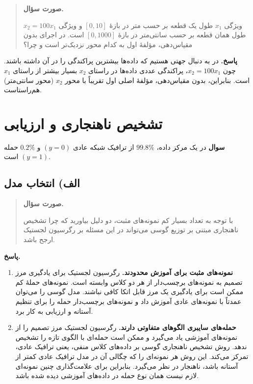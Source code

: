 \documentclass{article}
\numberwithin{equation}{section}
\numberwithin{table}{section}
\newenvironment{questionprompt}{%
    \begin{quote}\noindent\textbf{صورت سؤال.}\enspace\ignorespaces
}{%
    \end{quote}\noindent\textbf{پاسخ.}\enspace\ignorespacesafterend
}
\begin{document}
\begin{questionprompt}
    ویژگی \(x_1\) طول یک قطعه بر حسب متر در بازهٔ \([0,10]\) و ویژگی \(x_2=100x_1\) طول همان قطعه بر حسب سانتی‌متر در بازهٔ \([0,1000]\) است. در اجرای  بدون مقیاس‌دهی، مؤلفهٔ اول به کدام محور نزدیک‌تر است و چرا؟
\end{questionprompt}
در  به دنبال جهتی هستیم که داده‌ها بیشترین پراکندگی را در آن داشته باشند. چون \(x_2=100x_1\)، پراکندگی عددی داده‌ها در راستای \(x_2\) بسیار بیشتر از راستای \(x_1\) است. بنابراین، بدون مقیاس‌دهی، مؤلفهٔ اصلی اول تقریباً با محور \(x_2\) (محور سانتی‌متر) هم‌راستاست.

\section{تشخیص ناهنجاری و ارزیابی}

\noindent\textbf{سوال}
در یک مرکز داده، \(99.8\%\) از ترافیک شبکه عادی \((y=0)\) و \(0.2\%\) حمله \((y=1)\) است.

\subsection*{الف) انتخاب مدل}
\begin{questionprompt}
    با توجه به تعداد بسیار کم نمونه‌های مثبت، دو دلیل بیاورید که چرا تشخیص ناهنجاری مبتنی بر توزیع گوسی می‌تواند در این مسئله بر رگرسیون لجستیک ارجح باشد.
\end{questionprompt}
\begin{enumerate}
    \item \textbf{نمونه‌های مثبت برای آموزش محدودند.}
    رگرسیون لجستیک برای یادگیری مرز تصمیم به نمونه‌های برچسب‌دار از هر دو کلاس وابسته است. نمونه‌های حملهٔ کم ممکن است برای یادگیری یک مرز قابل اتکا کافی نباشند. مدل گوسی را می‌توان عمدتاً با نمونه‌های عادی آموزش داد و نمونه‌های برچسب‌دار حمله را برای تنظیم آستانه و ارزیابی به کار برد.
    \item \textbf{حمله‌های سایبری الگوهای متفاوتی دارند.}
    رگرسیون لجستیک مرز تصمیم را از نمونه‌های آموزشی یاد می‌گیرد و ممکن است حمله‌ای با الگوی تازه را تشخیص ندهد. روش تشخیص ناهنجاری گوسی بر داده‌های کلاس منفی، یعنی ترافیک عادی، تمرکز می‌کند. این روش هر نمونه‌ای را که چگالی آن در مدل ترافیک عادی کمتر از آستانه باشد، ناهنجار در نظر می‌گیرد. بنابراین برای علامت‌گذاری چنین نمونه‌ای لازم نیست همان نوع حمله در داده‌های آموزشی دیده شده باشد.
\end{enumerate}
\end{document}
